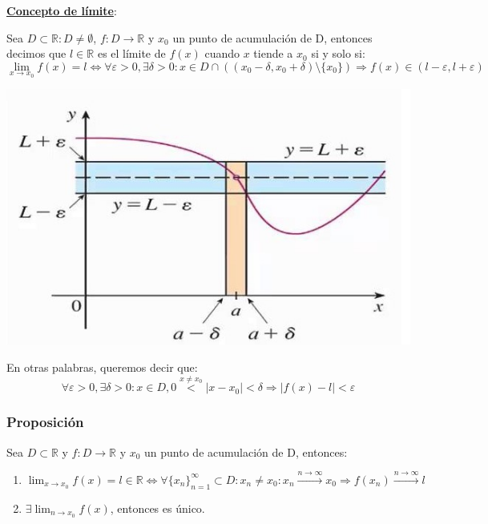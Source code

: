 \documentclass[10pt,a4paper,openright]{book}
\begin{document}
\textbf{\underline{Concepto de límite}}:\par

Sea $D\subset \mathbb R: D\neq \emptyset$, $f:D\longrightarrow \mathbb R$ y $x_0$ un punto de acumulación de D, entonces decimos que $l\in \mathbb R$ es el límite de $f(x)$ cuando $x$ tiende a $x_0$ si y solo si:
$$\lim_{x\rightarrow x_0} f(x)=l\Leftrightarrow \forall \varepsilon>0, \exists \delta>0 : x\in D\cap \left((x_0-\delta, x_0+\delta)\mbox{\textbackslash} \{x_0\}\right)\Rightarrow f(x)\in (l-\varepsilon, l+\varepsilon)$$

\begin{center}
\includegraphics[scale=0.40]{limite}
\end{center}

En otras palabras, queremos decir que:
$$\forall \varepsilon>0, \exists \delta>0 : x\in D,  0\stackrel{x\neq x_0}{<}|x-x_0|<\delta\Rightarrow |f(x)-l|<\varepsilon$$

\subsubsection*{Proposición}
Sea $D\subset \mathbb R$ y $f:D\longrightarrow \mathbb R$ y $x_0$ un punto de acumulación de D, entonces:
\begin{enumerate}
\item $\lim_{x\rightarrow x_0} f(x)=l\in \mathbb R \Leftrightarrow \forall \{x_n\}_{n=1}^\infty\subset D: x_n\neq x_0: x_n\xrightarrow{n\rightarrow \infty} x_0\Rightarrow 	f(x_n)\xrightarrow{n\rightarrow \infty} l$

\item $\exists \lim_{n\rightarrow x_0} f(x)$, entonces es único.
\end{enumerate}
\end{document}
